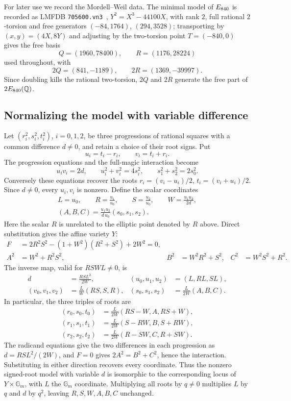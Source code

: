 For later use we record the Mordell--Weil data. The minimal model of
$E_{840}$ is recorded as LMFDB \texttt{705600.vn3}~\cite{LMFDB},
$Y^2=X^3-44100X$, with
rank $2$, full rational $2$-torsion and free generators $(-84,1764)$,
$(294,3528)$; transporting by $(x,y)=(4X,8Y)$ and adjusting by the
two-torsion point $T=(-840,0)$ gives the free basis
\[
Q=(1960,78400),\qquad R=(1176,28224)
\]
used throughout, with
\[
2Q=(841,-1189),\qquad 2R=(1369,-39997).
\]
Since doubling kills the rational two-torsion, $2Q$ and $2R$ generate the
free part of $2E_{840}(\mathbb{Q})$.

\subsection{Normalizing the model with variable difference}

Let $(r_i^2,s_i^2,t_i^2)$, $i=0,1,2$, be three progressions of rational
squares with a common difference $d\ne0$, and retain a choice of their
root signs. Put
\[
u_i=t_i-r_i,\qquad v_i=t_i+r_i.
\]
The progression equations and the full-magic interaction become
\[
u_iv_i=2d,\qquad u_i^2+v_i^2=4s_i^2,\qquad
s_1^2+s_2^2=2s_0^2.
\]
Conversely these equations recover the roots
$r_i=(v_i-u_i)/2$, $t_i=(v_i+u_i)/2$. Since $d\ne0$, every $u_i,v_i$
is nonzero. Define the scalar coordinates
\[
\begin{gathered}
L=u_0,\qquad R=\frac{u_1}{u_0},\qquad
S=\frac{u_2}{u_0},\qquad W=\frac{u_1u_2}{2d},\\
(A,B,C)=\frac{u_1u_2}{d\,u_0}(s_0,s_1,s_2).
\end{gathered}
\]
Here the scalar $R$ is unrelated to the elliptic point denoted by $R$
above. Direct substitution gives the affine variety $Y$:
\[
\begin{aligned}
F&=2R^2S^2-(1+W^2)(R^2+S^2)+2W^2=0,\\
A^2&=W^2+R^2S^2, & B^2&=W^2R^2+S^2, & C^2&=W^2S^2+R^2.
\end{aligned}
\]
The inverse map, valid for $RSWL\ne0$, is
\[
\begin{aligned}
d&=\frac{RSL^2}{2W},&
(u_0,u_1,u_2)&=(L,RL,SL),\\
(v_0,v_1,v_2)&=\frac L W(RS,S,R),&
(s_0,s_1,s_2)&=\frac L{2W}(A,B,C).
\end{aligned}
\]
In particular, the three triples of roots are
\begin{equation}\label{eq:surface-root-map}
\begin{aligned}
(r_0,s_0,t_0)&=\frac L{2W}(RS-W,A,RS+W),\\
(r_1,s_1,t_1)&=\frac L{2W}(S-RW,B,S+RW),\\
(r_2,s_2,t_2)&=\frac L{2W}(R-SW,C,R+SW).
\end{aligned}
\end{equation}
The radicand equations give the two differences in each progression as
$d=RSL^2/(2W)$, and $F=0$ gives $2A^2=B^2+C^2$, hence the interaction.
Substituting in either direction recovers every coordinate. Thus the
nonzero signed-root model with variable $d$ is isomorphic to the
corresponding locus of $Y\times\mathbb G_m$, with $L$ the
$\mathbb G_m$ coordinate. Multiplying all roots by $q\ne0$ multiplies
$L$ by $q$ and $d$ by $q^2$, leaving $R,S,W,A,B,C$ unchanged.

